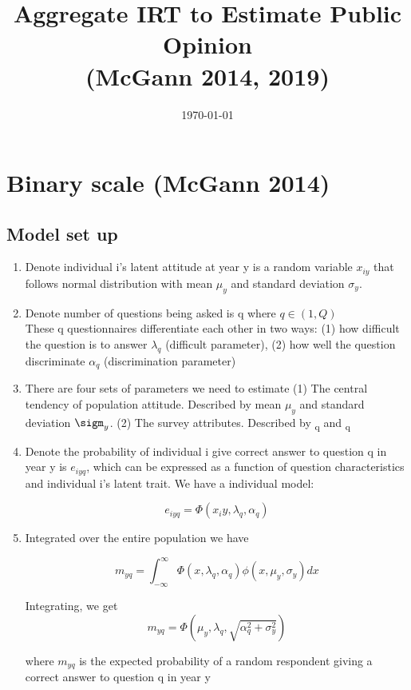\documentclass{article}
\title{Aggregate IRT to Estimate Public Opinion  \\
(McGann 2014, 2019)}
\date{\today}
\begin{document}
\maketitle
\section{Binary scale (McGann 2014)}
\subsection{Model set up}
\begin{enumerate}
    \item Denote individual i's latent attitude at year y is a random variable  $x_{iy}$ that follows normal distribution with mean $\mu_y$ and standard deviation $\sigma_y$. 
    
    \item Denote number of questions being asked is  q where $q \in (1, Q)$  \\
     These q questionnaires differentiate each other in two ways: 
    \subitem (1) how difficult the question is to answer $\lambda_q$ (difficult parameter),   
    \subitem (2) how well the question discriminate  $\alpha_q$ (discrimination parameter)
    
    \item There are four sets of parameters we need to estimate 
        \subitem (1) The central tendency of population attitude.
                     Described by  mean $\mu_y$ and standard deviation $\sigm_y$. 
        \subitem (2) The survey attributes. Described by \textlambda\textsubscript{q} and \textalpha\textsubscript{q}

    
        \item Denote the probability of individual i give correct answer to question q in year y is $e_{iyq}$, which can be expressed as a function of question characteristics and individual i's latent trait. We have a individual model: 
        
     \begin{equation}
        e_{iyq} = \Phi(x_iy,\lambda_q,\alpha_q)
    \end{equation}
    \item Integrated over the entire population we have 
    
    \begin{equation}
        m_{yq} = \int_{-\infty}^{\infty}
        \Phi(x,\lambda_q,\alpha_q)\phi(x,\mu_y, \sigma_y)dx
    \end{equation}
    
    Integrating, we get 
    \begin{equation}
         m_{yq} = \Phi(\mu_y,\lambda_q, \sqrt{\alpha _q^2 + \sigma_y^2  }  )
    \end{equation}

    where $m_{yq}$ is the expected probability of a random respondent giving a correct answer to question q in year y
 \end{enumerate}
   
\end{document}
